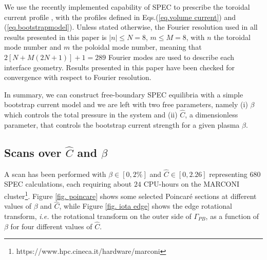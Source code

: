 \documentclass[my_thesis.tex]{subfiles}
\begin{document}
We use the recently implemented capability of SPEC to prescribe the toroidal current profile \citep{Baillod2021}, with the profiles defined in Eqs.(\ref{eq.volume current}) and (\ref{eq.bootstrapmodel}).
Unless stated otherwise, the Fourier resolution used in all results presented in this paper is $|n|\leq N=8$, $m\leq M=8$, with $n$ the toroidal mode number and $m$ the poloidal mode number, meaning that $2[N+M(2N+1)]+1=289$ Fourier modes are used to describe each interface geometry. Results presented in this paper have been checked for convergence with respect to Fourier resolution. 


In summary, we can construct free-boundary SPEC equilibria with a simple bootstrap current model and we are left with two free parameters, namely (i) $\beta$ which controls the total pressure in the system and (ii) $\hat{C}$, a dimensionless parameter, that controls the bootstrap current strength for a given plasma $\beta$. 
	
	
	






\subsection{Scans over $\hat{C}$ and $\beta$}
A scan has been performed with $\beta\in[0,2\%]$ and $\hat{C}\in[0,2.26]$ representing $680$ SPEC calculations, each requiring about $24$ CPU-hours on the MARCONI cluster\footnote{https://www.hpc.cineca.it/hardware/marconi}. Figure \ref{fig. poincare} shows some selected Poincar\'e sections at different values of $\beta$ and $\hat{C}$, while Figure \ref{fig. iota edge} shows the edge rotational transform, \textit{i.e.} the rotational transform on the outer side of $\Gamma_{PB}$, as a function of $\beta$ for four different values of $\hat{C}$.
\end{document}
